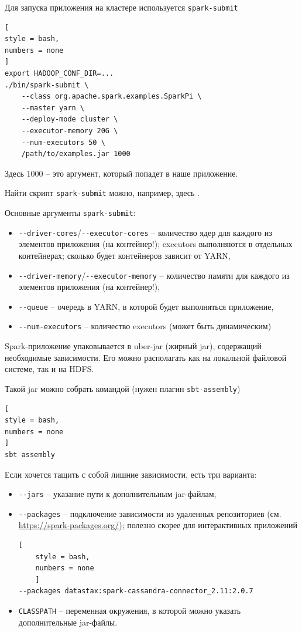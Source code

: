 \documentclass[%
	11pt,
	a4paper,
	utf8,
		]{article}
\begin{document}
Для запуска приложения на кластере используется \texttt{spark-submit}
\begin{lstlisting}[
style = bash,
numbers = none	
]
export HADOOP_CONF_DIR=...
./bin/spark-submit \
    --class org.apache.spark.examples.SparkPi \
    --master yarn \
    --deploy-mode cluster \
    --executor-memory 20G \
    --num-executors 50 \
    /path/to/examples.jar 1000
\end{lstlisting}

Здесь 1000 -- это аргумент, который попадет в наше приложение.

Найти скрипт \texttt{spark-submit} можно, например, здесь .

Основные аргументы \texttt{spark-submit}:
\begin{itemize}
	\item \verb*|--driver-cores|/\verb*|--executor-cores| -- количество ядер для каждого из элементов приложения (на контейнер!); executors выполняются в отдельных контейнерах; сколько будет контейнеров зависит от YARN,
	
	\item \verb*|--driver-memory|/\verb*|--executor-memory| -- количество памяти для каждого из элементов приложения (на контейнер!),
	
	\item \verb*|--queue| -- очередь в YARN, в которой будет выполняться приложение,
	
	\item \verb*|--num-executors| -- количество executors (может быть динамическим)
\end{itemize}

Spark-приложение упаковывается в uber-jar (жирный jar), содержащий необходимые зависимости. Его можно располагать как на локальной файловой системе, так и на HDFS.

Такой jar можно собрать командой (нужен плагин \texttt{sbt-assembly})
\begin{lstlisting}[
style = bash,
numbers = none	
]
sbt assembly
\end{lstlisting}

Если хочется тащить с собой лишние зависимости, есть три варианта:
\begin{itemize}
	\item \verb*|--jars| -- указание пути к дополнительным jar-файлам,
	
	\item \verb*|--packages| -- подключение зависимости из удаленных репозиториев (см. \url{https://spark-packages.org/}); полезно скорее для интерактивных приложений
	
	\begin{lstlisting}[
	style = bash,
	numbers = none
	]
--packages datastax:spark-cassandra-connector_2.11:2.0.7
	\end{lstlisting}

    \item \texttt{CLASSPATH} -- переменная окружения, в которой можно указать дополнительные jar-файлы.
\end{itemize}
\end{document}
